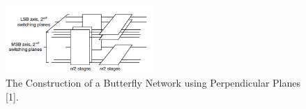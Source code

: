 \documentclass[letterpaper, 10 pt, conference]{ieeeconf}
\begin{document}
\begin{figure}[!ht] %
	\centering
	\includegraphics [width=0.5\textwidth] {Perpendicular_Planes_Butterfly.PNG} 
    \caption{The Construction of a Butterfly Network using Perpendicular Planes [1].}
\end{figure}

\addtolength{\textheight}{-12cm}   %
\end{document}
